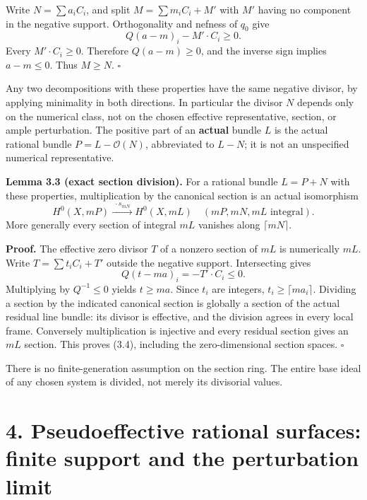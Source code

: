 \documentclass[
  10pt,
]{article}
\begin{document}
Write \(N=\sum a_iC_i\), and split \(M=\sum m_iC_i+M'\) with \(M'\)
having no component in the negative support. Orthogonality and nefness
of \(q_0\) give \[
 Q(a-m)_i-M'\cdot C_i\geq0.
\] Every \(M'\cdot C_i\geq0\). Therefore \(Q(a-m)\geq0\), and the
inverse sign implies \(a-m\leq0\). Thus \(M\geq N\). \(\square\)

Any two decompositions with these properties have the same negative
divisor, by applying minimality in both directions. In particular the
divisor \(N\) depends only on the numerical class, not on the chosen
effective representative, section, or ample perturbation. The positive
part of an \textbf{actual} bundle \(L\) is the actual rational bundle
\(P=L-\mathcal O(N)\), abbreviated to \(L-N\); it is not an unspecified
numerical representative.

\textbf{Lemma 3.3 (exact section division).} For a rational bundle
\(L=P+N\) with these properties, multiplication by the canonical section
is an actual isomorphism \[
 H^0(X,mP)\xrightarrow{\;\cdot s_{mN}\;}H^0(X,mL)
                   \quad(mP,mN,mL\text{ integral}).              \tag{3.4}
\] More generally every section of integral \(mL\) vanishes along
\(\lceil mN\rceil\).

\textbf{Proof.} The effective zero divisor \(T\) of a nonzero section of
\(mL\) is numerically \(mL\). Write \(T=\sum t_iC_i+T'\) outside the
negative support. Intersecting gives \[
 Q(t-ma)_i=-T'\cdot C_i\leq0.
\] Multiplying by \(Q^{-1}\leq0\) yields \(t\geq ma\). Since \(t_i\) are
integers, \(t_i\geq\lceil ma_i\rceil\). Dividing a section by the
indicated canonical section is globally a section of the actual residual
line bundle: its divisor is effective, and the division agrees in every
local frame. Conversely multiplication is injective and every residual
section gives an \(mL\) section. This proves (3.4), including the
zero-dimensional section spaces. \(\square\)

There is no finite-generation assumption on the section ring. The entire
base ideal of any chosen system is divided, not merely its divisorial
values.

\section{4. Pseudoeffective rational surfaces: finite support and the
perturbation
limit}\label{pseudoeffective-rational-surfaces-finite-support-and-the-perturbation-limit}
\end{document}
